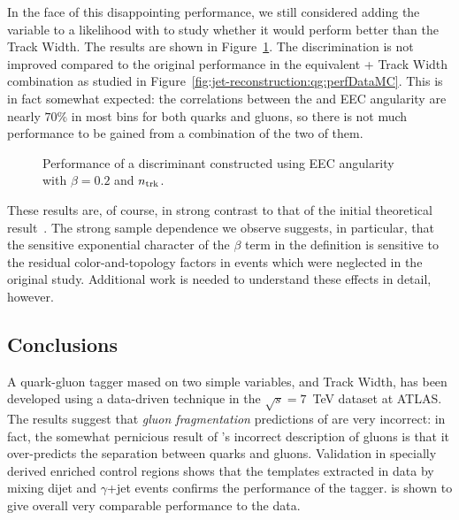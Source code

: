 In the face of this disappointing performance, we still considered adding the variable to a likelihood with \ntrk to study whether it would perform better than the Track Width. The results are shown in Figure~\ref{fig:jet-reconstruction:qg:eec_ntrk_perf}. The discrimination is not improved compared to the original performance in the equivalent \ntrk + Track Width combination as studied in Figure~\ref{fig:jet-reconstruction:qg:perfDataMC}. This is in fact somewhat expected: the correlations between the \ntrk and EEC angularity are nearly $70\%$ in most \pt bins for both quarks and gluons, so there is not much performance to be gained from a combination of the two of them. 

\begin{figure}[!h]
	\centering
	\caption{Performance of a discriminant constructed using EEC angularity with $\beta=0.2$ and $n_{\rm trk}$.
	\label{fig:jet-reconstruction:qg:eec_ntrk_perf}}
\end{figure}

These results are, of course, in strong contrast to that of the initial theoretical result~\cite{EEC}. The strong sample dependence we observe suggests, in particular, that the sensitive exponential character of the $\beta$ term in the definition is sensitive to the residual color-and-topology factors in events which were neglected in the original study. Additional work is needed to understand these effects in detail, however.


\subsection{Conclusions}

A quark-gluon tagger mased on two simple variables, \ntrk and Track Width, has been developed using a data-driven technique in the $\sqrt{s} = 7$~TeV dataset at ATLAS. The results suggest that \textit{gluon fragmentation} predictions of \Pythia are very incorrect: in fact, the somewhat pernicious result of \Pythia's incorrect description of gluons is that it over-predicts the separation between quarks and gluons. Validation in specially derived enriched control regions shows that the templates extracted in data by mixing dijet and $\gamma$+jet events confirms the performance of the tagger. \Herwigpp is shown to give overall very comparable performance to the data.

